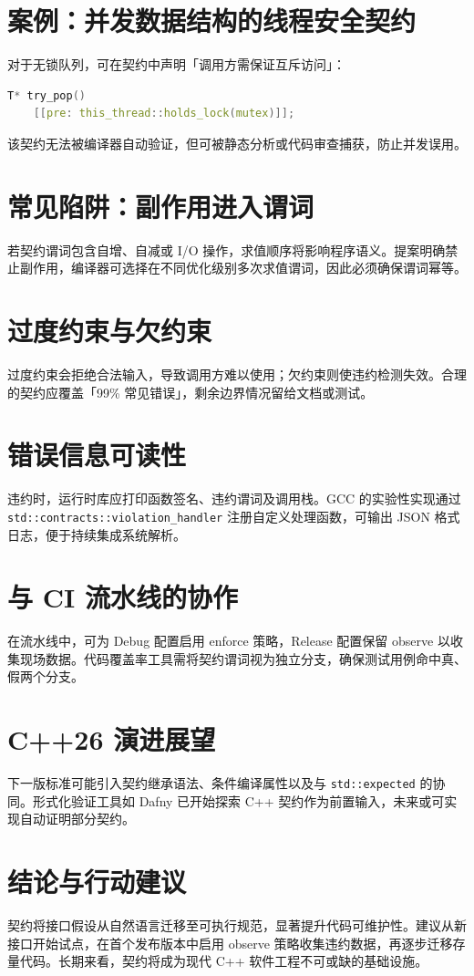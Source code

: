 \chapter{案例：并发数据结构的线程安全契约}
对于无锁队列，可在契约中声明「调用方需保证互斥访问」：\par
\begin{lstlisting}[language=cpp]
T* try_pop()
    [[pre: this_thread::holds_lock(mutex)]];
\end{lstlisting}
该契约无法被编译器自动验证，但可被静态分析或代码审查捕获，防止并发误用。\par
\chapter{常见陷阱：副作用进入谓词}
若契约谓词包含自增、自减或 I/O 操作，求值顺序将影响程序语义。提案明确禁止副作用，编译器可选择在不同优化级别多次求值谓词，因此必须确保谓词幂等。\par
\chapter{过度约束与欠约束}
过度约束会拒绝合法输入，导致调用方难以使用；欠约束则使违约检测失效。合理的契约应覆盖「99\%{} 常见错误」，剩余边界情况留给文档或测试。\par
\chapter{错误信息可读性}
违约时，运行时库应打印函数签名、违约谓词及调用栈。GCC 的实验性实现通过 \texttt{std::contracts::violation\_{}handler} 注册自定义处理函数，可输出 JSON 格式日志，便于持续集成系统解析。\par
\chapter{与 CI 流水线的协作}
在流水线中，可为 Debug 配置启用 enforce 策略，Release 配置保留 observe 以收集现场数据。代码覆盖率工具需将契约谓词视为独立分支，确保测试用例命中真、假两个分支。\par
\chapter{C++26 演进展望}
下一版标准可能引入契约继承语法、条件编译属性以及与 \texttt{std::expected} 的协同。形式化验证工具如 Dafny 已开始探索 C++ 契约作为前置输入，未来或可实现自动证明部分契约。\par
\chapter{结论与行动建议}
契约将接口假设从自然语言迁移至可执行规范，显著提升代码可维护性。建议从新接口开始试点，在首个发布版本中启用 observe 策略收集违约数据，再逐步迁移存量代码。长期来看，契约将成为现代 C++ 软件工程不可或缺的基础设施。\par
